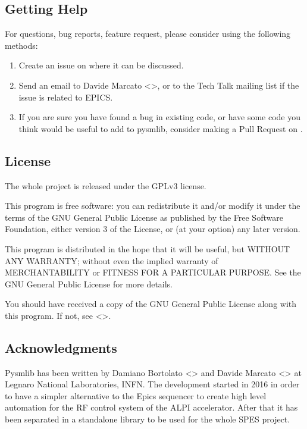 \documentclass[letterpaper,10pt,english]{sphinxmanual}
\begin{document}
\subsection{Getting Help}
\label{\detokenize{installation:getting-help}}
For questions, bug reports, feature request, please consider using the
following methods:
\begin{enumerate}
\item {} 
Create an issue on  where it can be discussed.

\item {} 
Send an email to Davide Marcato \textless{}\textgreater{}, or
to the Tech Talk mailing list if the issue is related to EPICS.

\item {} 
If you are sure you have found a bug in existing code, or have
some code you think would be useful to add to pysmlib, consider
making a Pull Request on .

\end{enumerate}


\subsection{License}
\label{\detokenize{installation:license}}
The whole project is released under the GPLv3 license.

This program is free software: you can redistribute it and/or modify
it under the terms of the GNU General Public License as published by
the Free Software Foundation, either version 3 of the License, or
(at your option) any later version.

This program is distributed in the hope that it will be useful,
but WITHOUT ANY WARRANTY; without even the implied warranty of
MERCHANTABILITY or FITNESS FOR A PARTICULAR PURPOSE.  See the
GNU General Public License for more details.

You should have received a copy of the GNU General Public License
along with this program.  If not, see \textless{}\textgreater{}.


\subsection{Acknowledgments}
\label{\detokenize{installation:acknowledgments}}
Pysmlib has been written by Damiano Bortolato \textless{}\textgreater{}
and Davide Marcato \textless{}\textgreater{} at Legnaro National Laboratories,
INFN. The development started in 2016 in order to have a simpler alternative to
the Epics sequencer to create high level automation for the RF control
system of the ALPI accelerator. After that it has been separated in a standalone library to be used for the whole SPES project.
\end{document}
